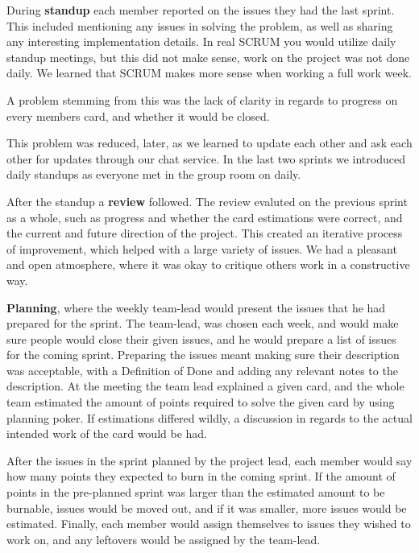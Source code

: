 During \textbf{standup} each member reported on the issues they had the last sprint.
This included mentioning any issues in solving the problem, as well as sharing any interesting implementation details.
In real SCRUM you would utilize daily standup meetings, but this did not make sense, work on the project was not done daily.
We learned that SCRUM makes more sense when working a full work week.

A problem stemming from this was the lack of clarity in regards to progress on every members card, and whether it would be closed.

This problem was reduced, later, as we learned to update each other and ask each other for updates through our chat service.
In the last two sprints we introduced daily standups as everyone met in the group room on daily.


After the standup a \textbf{review} followed.
The review evaluted on the previous sprint as a whole, such as progress and whether the card estimations were correct, and the current and future direction of the project.
This created an iterative process of improvement, which helped with a large variety of issues.
We had a pleasant and open atmosphere, where it was okay to critique others work in a constructive way.


\textbf{Planning}, where the weekly team-lead would present the issues that he had prepared for the sprint. 
The team-lead, was chosen each week, and would make sure people would close their given issues, and he would prepare a list of issues for the coming sprint.
Preparing the issues meant making sure their description was acceptable, with a Definition of Done and adding any relevant notes to the description.
At the meeting the team lead explained a given card, and the whole team estimated the amount of points required to solve the given card by using planning poker.
If estimations differed wildly, a discussion in regards to the actual intended work of the card would be had. 

After the issues in the sprint planned by the project lead, each member would say how many points they expected to burn in the coming sprint.
If the amount of points in the pre-planned sprint was larger than the estimated amount to be burnable, issues would be moved out, and if it was smaller, more issues would be estimated.
Finally, each member would assign themselves to issues they wished to work on, and any leftovers would be assigned by the team-lead.

